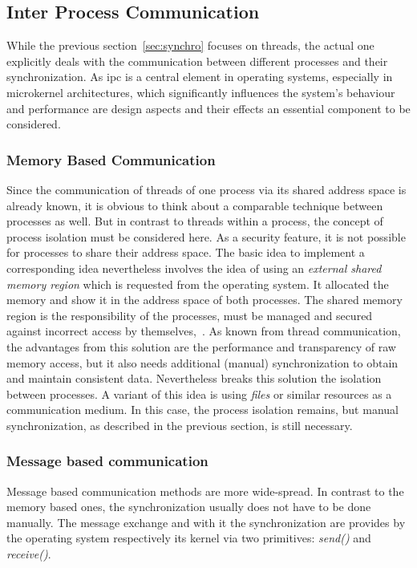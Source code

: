 \subsection{Inter Process Communication}\label{sec:ipc}
While the previous section~\ref{sec:synchro} focuses on threads, the actual one explicitly deals with the communication between different processes and their synchronization.
As \ac{ipc} is a central element in operating systems, especially in microkernel architectures, which significantly influences the system's behaviour and performance are design aspects and their effects an essential component to be considered.

\subsubsection{Memory Based Communication}
Since the communication of threads of one process via its shared address space is already known, it is obvious to think about a comparable technique between processes as well.
But in contrast to threads within a process, the concept of process isolation must be considered here.
As a security feature, it is not possible for processes to share their address space. 
The basic idea to implement a corresponding idea nevertheless involves the idea of using an \textit{external shared memory region} which is requested from the operating system.
It allocated the memory and show it in the address space of both processes\cite{brause2017betriebssysteme}.
The shared memory region is the responsibility of the processes, must be managed and secured against incorrect access by themselves\cite{brause2017betriebssysteme},~\cite{glatz2015betriebssysteme}.
As known from thread communication, the advantages from this solution are the performance and transparency of raw memory access, but it also needs additional (manual) synchronization to obtain and maintain consistent data\cite{glatz2015betriebssysteme}.
Nevertheless breaks this solution the isolation between processes. 
A variant of this idea is using \textit{files} or similar resources as a communication medium.
In this case, the process isolation remains, but manual synchronization, as described in the previous section, is still necessary\cite{brause2017betriebssysteme}.


\subsubsection{Message based communication}
Message based communication methods are more wide-spread.
In contrast to the memory based ones, the synchronization usually does not have to be done manually.
The message exchange and with it the synchronization are provides by the operating system respectively its kernel via two primitives: \textit{send()} and \textit{receive()}\cite{tanenbaum-modern-operating-systems}.


